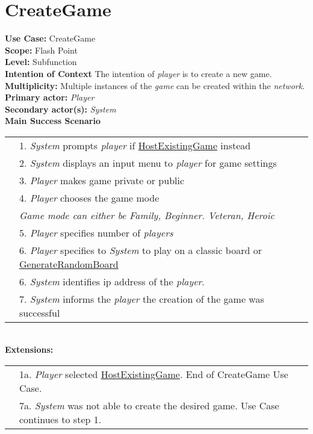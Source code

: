 \documentclass{article}
\begin{document}
	\section*{CreateGame}
	\textbf{Use Case:} CreateGame\\
	\textbf{Scope:}
	Flash Point\\
	\textbf{Level:}
	Subfunction\\
	\textbf{Intention of Context}
	The intention of \textit{player} is to create a new game.\\
	\textbf{Multiplicity:}
	Multiple instances of the \textit{game} can be created within the \textit{network}.\\
	\textbf{Primary actor: } \textit{Player}\\
	\textbf{Secondary actor(s):} \textit{System}\\
	\textbf{Main Success Scenario}\\
	\begin{tabular}{l l}
		&1. \textit{System} prompts \textit{player} if \underline{HostExistingGame} instead\\
		&2. \textit{System} displays an input menu to \textit{player} for game settings\\
		&3. \textit{Player} makes game private or public\\
		&4. \textit{Player} chooses the game mode\\
		&\qquad \textit{Game mode can either be Family, Beginner. Veteran, Heroic}\\
		&5. \textit{Player} specifies number of \textit{players}\\
		&6. \textit{Player} specifies to \textit{System} to play on a classic board or \underline{GenerateRandomBoard}\\
		&6. \textit{System} identifies ip address of the \textit{player}.\\
		&7. \textit{System} informs the \textit{player} the creation of the game was successful
	\end{tabular}\\
	\textbf{Extensions:}\\
	\begin{tabular}{l l}
		&1a. \textit{Player} selected \underline{HostExistingGame}. End of CreateGame Use Case.\\
		&7a. \textit{System} was not able to create the desired game. Use Case continues to step 1.
	\end{tabular}
\end{document}
